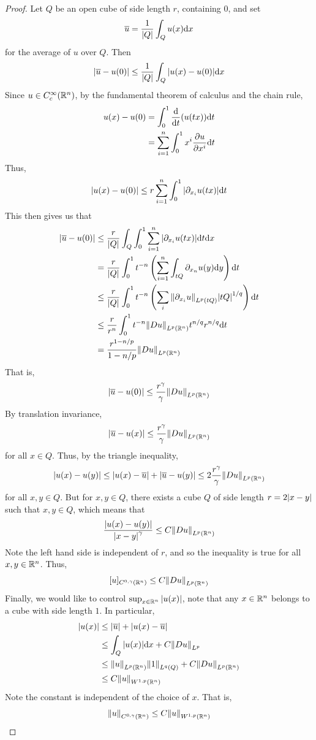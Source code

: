 \documentclass{article}
\begin{document}
\begin{proof}
    Let \(Q\) be an open cube of side length \(r\), containing \(0\), and set
    \[\overline u = \frac{1}{\abs{Q}}\int_Q u(x)\dd x\]
    for the average of \(u\) over \(Q\). Then
    \[\abs{\overline u - u(0)} \le \frac{1}{\abs{Q}}\int_Q\abs{u(x) - u(0)}\dd x\]
    Since \(u \in C_c^\infty(\mathbb{R}^n)\), by the fundamental theorem of calculus and the chain rule,
    \begin{align*}
        u(x) - u(0) &= \int_0^1 \dv{t}(u(tx))\dd t \\
        &= \sum_{i=1}^n \int_0^1 x^i \pdv{u}{x^i}(tx)\dd t
    \end{align*}
    Thus,
    \[\abs{u(x) - u(0)} \le r\sum_{i=1}^n \int_0^1 \abs{\partial_{x_i}u(tx)}\dd t\]
    This then gives us that
    \begin{align*}
        \abs{\overline u - u(0)} &\le \frac{r}{\abs{Q}}\int_Q\int_0^1 \sum_{i=1}^n \abs{\partial_{x_i}u(tx)}\dd t \dd x \\
        &= \frac{r}{\abs{Q}}\int_0^1 t^{-n}\left(\sum_{i=1}^n \int_{tQ} \partial_{x_n}u(y)\dd y\right) \dd t \\
        &\le \frac{r}{\abs{Q}}\int_0^1 t^{-n}\left(\sum_i \norm{\partial_{x_i}u}_{L^p(tQ)}\abs{tQ}^{1/q}\right)\dd t \\
        &\le \frac{r}{r^n}\int_0^1 t^{-n}\norm{Du}_{L^p(\mathbb{R}^n)}t^{n/q}r^{n/q}\dd t \\
        &= \frac{r^{1-n/p}}{1 - n/p}\norm{Du}_{L^p(\mathbb{R}^n)}
    \end{align*}
    That is,
    \[\abs{\overline u - u(0)} \le \frac{r^\gamma}{\gamma}\norm{Du}_{L^p(\mathbb{R}^n)}\]
    By translation invariance,
    \[\abs{\overline u - u(x)} \le \frac{r^\gamma}{\gamma}\norm{Du}_{L^p(\mathbb{R}^n)}\]
    for all \(x \in Q\). Thus, by the triangle inequality,
    \[\abs{u(x) - u(y)} \le \abs{u(x) - \overline u} + \abs{\overline u - u(y)} \le 2\frac{r^\gamma}{\gamma}\norm{Du}_{L^p(\mathbb{R}^n)}\]
    for all \(x, y \in Q\). But for \(x, y \in Q\), there exists a cube \(Q\) of side length \(r = 2\abs{x - y}\) such that \(x, y \in Q\), which means that
    \[\frac{\abs{u(x) - u(y)}}{\abs{x - y}^\gamma} \le C \norm{Du}_{L^p(\mathbb{R}^n)}\]
    Note the left hand side is independent of \(r\), and so the inequality is true for all \(x, y \in \mathbb{R}^n\). Thus,
    \[[u]_{C^{0, \gamma}(\mathbb{R}^n)} \le C\norm{Du}_{L^p(\mathbb{R}^n)}\]
    Finally, we would like to control \(\sup_{x \in \mathbb{R}^n}\abs{u(x)}\), note that any \(x \in \mathbb{R}^n\) belongs to a cube with side length \(1\). In particular,
    \begin{align*}
        \abs{u(x)} &\le \abs{\overline u} + \abs{u(x) - \overline u} \\
        &\le \int_Q\abs{u(x)}\dd x + C \norm{Du}_{L^p} \\
        &\le \norm{u}_{L^p(\mathbb{R}^n)}\norm{1}_{L^q(Q)} + C\norm{Du}_{L^p(\mathbb{R}^n)} \\
        &\le C\norm{u}_{W^{1, p}(\mathbb{R}^n)}
    \end{align*}
    Note the constant is independent of the choice of \(x\). That is,
    \[\norm{u}_{C^{0, \gamma}(\mathbb{R}^n)} \le C\norm{u}_{W^{1, p}(\mathbb{R}^n)}\]
\end{proof}
\end{document}
